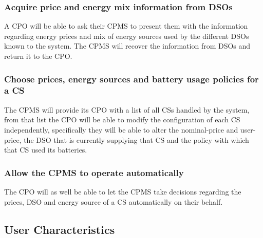 \documentclass[11pt]{article}
\begin{document}
\subsubsection{Acquire price and energy mix information from DSOs}

A CPO will be able to ask their CPMS to present them with the information regarding energy prices and mix of energy sources used by the different DSOs known to the system. The CPMS will recover the information from DSOs and return it to the CPO.

\subsubsection{Choose prices, energy sources and battery usage policies for a CS}

The CPMS will provide its CPO with a list of all CSs handled by the system, from that list the CPO will be able to modify the configuration of each CS independently, specifically they will be able to alter the nominal-price and user-price, the DSO that is currently supplying that CS and the policy with which that CS used its batteries.

\subsubsection{Allow the CPMS to operate automatically}

The CPO will as well be able to let the CPMS take decisions regarding the prices, DSO and energy source of a CS automatically on their behalf.

\subsection{User Characteristics}
\end{document}
